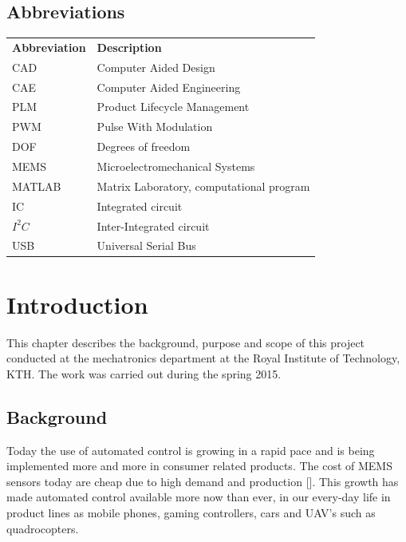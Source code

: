 \documentclass[a4paper,11pt]{kth-mag}
\begin{document}
\section*{Abbreviations}
\noindent{}\begin{tabular}{@{}p{2.5cm}l}
\textbf{Abbreviation} 	& \textbf{Description} \vspace{.5em} \\
CAD			& Computer Aided Design \\
CAE			& Computer Aided Engineering\\
PLM			& Product Lifecycle Management\\
PWM			& Pulse With Modulation\\
DOF			& Degrees of freedom\\
MEMS			& Microelectromechanical Systems \\
MATLAB		& Matrix Laboratory, computational program\\
IC			& Integrated circuit\\
$I^2C$		& Inter-Integrated circuit\\
USB			& Universal Serial Bus \\

\end{tabular}
\cleardoublepage

\mainmatter
\pagestyle{newchap}

\chapter{Introduction}
This chapter describes the background, purpose and scope of this project conducted at the mechatronics department at the Royal Institute of Technology, KTH. The work was carried out during the spring 2015.

\section{Background}
Today the use of automated control is growing in a rapid pace and is being implemented more and more in consumer related products. The cost of MEMS sensors today are cheap due to high demand and production [\cite{MEMSmarket}]. This growth has made automated control available more now than ever, in our every-day life in product lines as mobile phones, gaming controllers, cars and UAV's such as quadrocopters.
\end{document}

